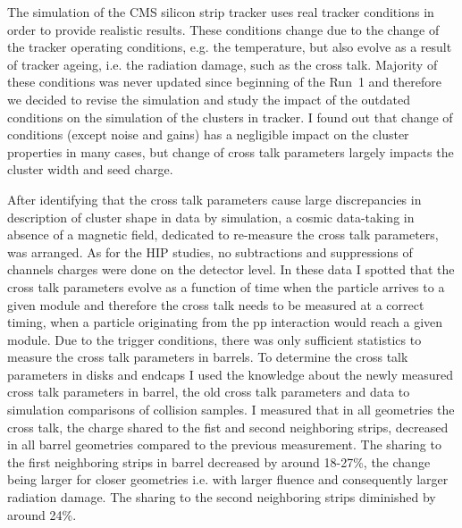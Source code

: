 




The simulation of the CMS silicon strip tracker uses real tracker conditions in order to provide realistic results. These conditions change due to the change of the tracker operating conditions, e.g. the temperature, but also evolve as a result of tracker ageing, i.e. the radiation damage, such as the cross talk. Majority of these conditions was never updated since beginning of the Run~1 and therefore we decided to revise the simulation and study the impact of the outdated conditions on the simulation of the clusters in tracker. I found out that change of conditions (except noise and gains) has a negligible impact on the cluster properties in many cases, but change of cross talk parameters largely impacts the cluster width and seed charge.

After identifying that the cross talk parameters cause large discrepancies in description of cluster shape in data by simulation, a cosmic data-taking in absence of a magnetic field, dedicated to re-measure the cross talk parameters, was arranged. As for the HIP studies, no subtractions and suppressions of channels charges were done on the detector level. In these data I spotted that the cross talk parameters evolve as a function of time when the particle arrives to a given module and therefore the cross talk needs to be measured at a correct timing, when a particle originating from the pp interaction would reach a given module. Due to the trigger conditions, there was only sufficient statistics to measure the cross talk parameters in barrels. To determine the cross talk parameters in disks and endcaps I used the knowledge about the newly measured cross talk parameters in barrel, the old cross talk parameters and data to simulation comparisons of collision samples. I measured that in all geometries the cross talk, the charge shared to the fist and second neighboring strips, decreased in all barrel geometries compared to the previous measurement. The sharing to the first neighboring strips in barrel decreased by around 18-27\%, the change being larger for closer geometries i.e. with larger fluence and consequently larger radiation damage. The sharing to the second neighboring strips diminished by around 24\%.

